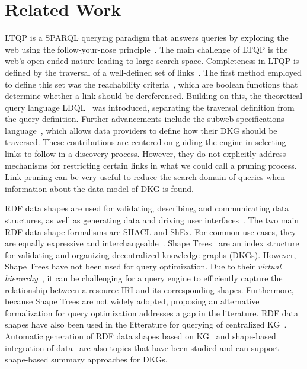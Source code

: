 \section{Related Work}

LTQP is a SPARQL querying paradigm that answers queries by exploring the web using the follow-your-nose principle~\cite{hartig2016walking}.
The main challenge of LTQP is the web's open-ended nature leading to large search space.
Completeness in LTQP is defined by the traversal of a well-defined set of links~\cite{Hartig2012}.
The first method employed to define this set was the reachability criteria~\cite{Hartig2012}, which are boolean functions that determine whether a link should be dereferenced.
Building on this, the theoretical query language LDQL~\cite{hartigLDQL} was introduced, separating the traversal definition from the query definition.
Further advancements include the subweb specifications language~\cite{Bogaerts2021LinkTW}, which allows data providers to define how their DKG should be traversed.
These contributions are centered on guiding the engine in selecting links to follow in a discovery process.
However, they do not explicitly address mechanisms for restricting certain links in what we could call a pruning process.
Link pruning can be very useful to reduce the search domain of queries when information about the data model of DKG is found.

RDF data shapes are used for validating, describing, and communicating data structures, as well as generating data and driving user interfaces~\cite{Gayo2018a,Gayo2018}.
The two main RDF data shape formalisms are SHACL and ShEx.
For common use cases, they are equally expressive and interchangeable~\cite{Gayo2018c}.
Shape Trees~\cite{shapetreesShapeTrees} are an index structure for validating and organizing decentralized knowledge graphs (DKGs).
However, Shape Trees have not been used for query optimization. 
Due to their \emph{virtual hierarchy}~\cite{shapetreesShapeTrees}, it can be challenging for a query engine to efficiently capture the relationship between a resource IRI and its corresponding shapes.
Furthermore, because Shape Trees are not widely adopted, proposing an alternative formalization for query optimization addresses a gap in the literature.
RDF data shapes have also been used in the litterature for querying of centralized KG~\cite{kashif2021}.
Automatic generation of RDF data shapes based on KG~\cite{fernandez2023extracting} and shape-based integration of data~\cite{LabraGayo2023} are also topics that have been studied and can support shape-based summary approaches for DKGs.

